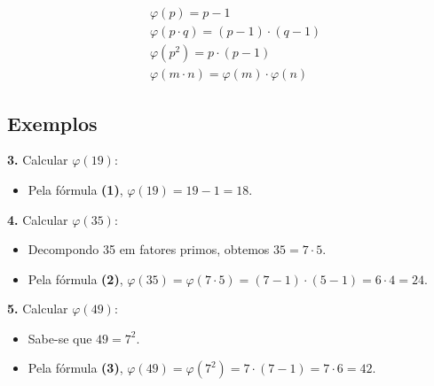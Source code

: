 \setcounter{equation}{0}
\begin{align}
     & \varphi(p) = p-1                                 \\
     & \varphi(p \cdot q) = (p-1)\cdot(q-1)             \\
     & \varphi(p^{2}) = p \cdot (p-1)                   \\
     & \varphi(m \cdot n) = \varphi(m) \cdot \varphi(n)
\end{align}

\subsection*{Exemplos}
\textbf{3.} Calcular $\varphi(19)$:

\begin{itemize}
    \item Pela fórmula \textbf{(1)}, $\varphi(19) = 19 - 1 = 18$.
\end{itemize}
\vspace{12pt}
\textbf{4.} Calcular $\varphi(35)$:

\begin{itemize}
    \item Decompondo 35 em fatores primos, obtemos $35 = 7 \cdot 5$.
    \item Pela fórmula \textbf{(2)}, $\varphi(35) = \varphi(7 \cdot 5) = (7 - 1) \cdot (5 - 1) = 6 \cdot 4 = 24$.
\end{itemize}
\vspace{12pt}
\textbf{5.} Calcular $\varphi(49)$:

\begin{itemize}
    \item Sabe-se que $49 = 7^{2}$.
    \item Pela fórmula \textbf{(3)}, $\varphi(49) = \varphi(7^{2}) = 7 \cdot (7 - 1) = 7 \cdot 6 = 42$.
\end{itemize}
